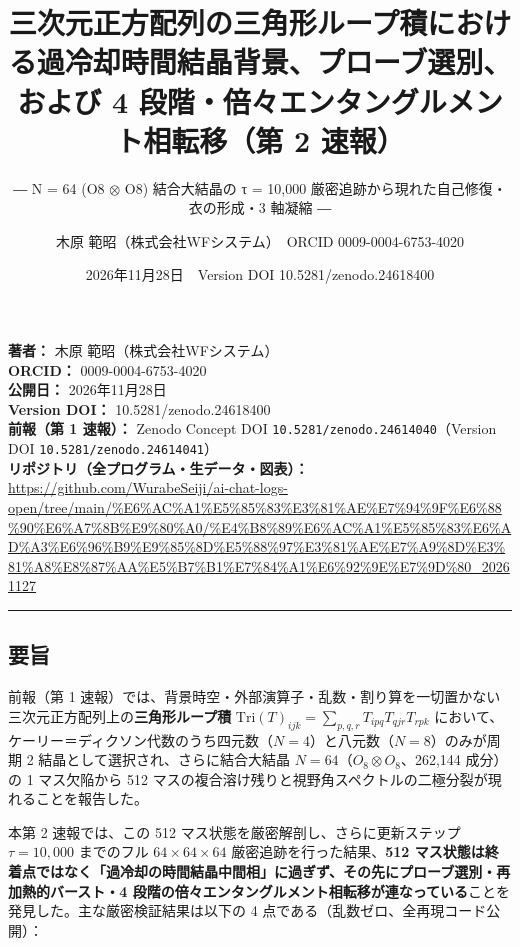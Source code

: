 \documentclass[
  a4paper,
]{ltjsarticle}
\title{三次元正方配列の三角形ループ積における過冷却時間結晶背景、プローブ選別、および
4 段階・倍々エンタングルメント相転移（第 2 速報）}
\subtitle{― N = 64 (O8 $\otimes$ O8) 結合大結晶の τ = 10,000
厳密追跡から現れた自己修復・衣の形成・3 軸凝縮 ―}
\author{木原 範昭（株式会社WFシステム）　ORCID 0009-0004-6753-4020}
\date{2026年11月28日　Version DOI 10.5281/zenodo.24618400}
\begin{document}
\maketitle

\textbf{著者：} 木原 範昭（株式会社WFシステム）\\
\textbf{ORCID：} 0009-0004-6753-4020\\
\textbf{公開日：} 2026年11月28日\\
\textbf{Version DOI：} 10.5281/zenodo.24618400\\
\textbf{前報（第 1 速報）：} Zenodo Concept DOI
\texttt{10.5281/\allowbreak{}zenodo.24614040}（Version DOI
\texttt{10.5281/\allowbreak{}zenodo.24614041}）\\
\textbf{リポジトリ（全プログラム・生データ・図表）：}
\url{https://github.com/WurabeSeiji/ai-chat-logs-open/tree/main/\%E6\%AC\%A1\%E5\%85\%83\%E3\%81\%AE\%E7\%94\%9F\%E6\%88\%90\%E6\%A7\%8B\%E9\%80\%A0/\%E4\%B8\%89\%E6\%AC\%A1\%E5\%85\%83\%E6\%AD\%A3\%E6\%96\%B9\%E9\%85\%8D\%E5\%88\%97\%E3\%81\%AE\%E7\%A9\%8D\%E3\%81\%A8\%E8\%87\%AA\%E5\%B7\%B1\%E7\%84\%A1\%E6\%92\%9E\%E7\%9D\%80\_20261127}

\begin{center}\rule{0.5\linewidth}{0.5pt}\end{center}

\subsection{要旨}\label{ux8981ux65e8}

前報（第 1
速報）では、背景時空・外部演算子・乱数・割り算を一切置かない三次元正方配列上の\textbf{三角形ループ積}
\(\mathrm{Tri}(T)_{ijk} = \sum_{p,q,r} T_{ipq} T_{qjr} T_{rpk}\)
において、ケーリー＝ディクソン代数のうち四元数（\(N=4\)）と八元数（\(N=8\)）のみが周期
2 結晶として選択され、さらに結合大結晶
\(N=64\)（\(O_8 \otimes O_8\)、262,144 成分）の 1 マス欠陥から 512
マスの複合溶け残りと視野角スペクトルの二極分裂が現れることを報告した。

本第 2 速報では、この 512 マス状態を厳密解剖し、さらに更新ステップ
\(\tau = 10,000\) までのフル \(64\times 64\times 64\)
厳密追跡を行った結果、\textbf{512
マス状態は終着点ではなく「過冷却の時間結晶中間相」に過ぎず、その先にプローブ選別・再加熱的バースト・4
段階の倍々エンタングルメント相転移が連なっている}ことを発見した。主な厳密検証結果は以下の
4 点である（乱数ゼロ、全再現コード公開）：
\end{document}
